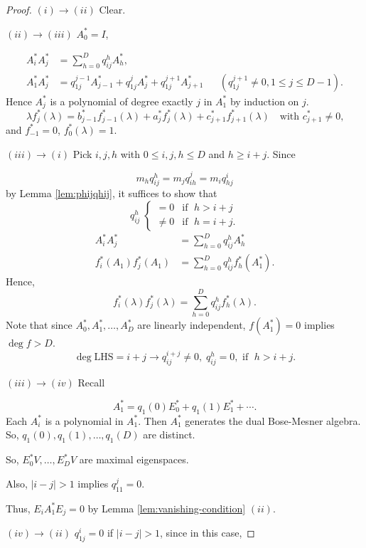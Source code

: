 \documentclass[
]{book}
\theoremstyle{definition}
\theoremstyle{definition}
\theoremstyle{definition}
\theoremstyle{definition}
\theoremstyle{remark}
\begin{document}
\begin{proof}
\leavevmode

\((i)\to (ii)\) Clear.

\((ii)\to(iii)\) \(A^*_0 = I\),

\begin{align}
A^*_iA^*_j & = \sum_{h=0}^D q^h_{ij} A^*_h,\\
A^*_1A^*_j & = q^{j-1}_{1j}A^*_{j-1} + q^j_{1j}A^*_j + q^{j+1}_{1j}A^*_{j+1} && (q^{j+1}_{1j}\neq 0, 1\leq j\leq D-1).
\end{align}
Hence \(A^*_j\) is a polynomial of degree exactly \(j\) in \(A^*_1\) by induction on \(j\).
\[\lambda f^*_j(\lambda) = b^*_{j-1}f^*_{j-1}(\lambda) + a^*_jf^*_j(\lambda) + c^*_{j+1}f^*_{j+1}(\lambda) \quad \text{with $c^*_{j+1}\neq 0$,}\]
and \(f^*_{-1} = 0\), \(f^*_0(\lambda) = 1\).

\((iii)\to(i)\) Pick \(i, j, h\) with \(0\leq i,j,h\leq D\) and \(h\geq i+j\). Since

\[m_hq^h_{ij} = m_jq^j_{ih} = m_iq^i_{hj}\]
by Lemma \ref{lem:phijqhij}, it suffices to show that
\[q^h_{ij} \; \begin{cases} = 0 & \text{if }\; h> i+j\\
\neq 0 & \text{if }\; h = i+j.
\end{cases}\]
\begin{align}
A^*_iA^*_j & = \sum_{h=0}^D q^h_{ij}A^*_h\\
f^*_i(A_1)f^*_j(A_1) & = \sum_{h=0}^D q^h_{ij}f^*_h(A_1^*).
\end{align}
Hence,
\[f^*_i(\lambda)f^*_j(\lambda) = \sum_{h=0}^Dq^h_{ij}f^*_h(\lambda).\]
Note that since \(A^*_0, A^*_1, \ldots, A^*_D\) are linearly independent, \(f(A^*_1) = 0\) implies \(\deg f > D\).
\[\deg \mathrm{LHS} = i+j \to q^{i+j}_{ij}\neq 0, \; q^h_{ij} = 0, \text{ if } \; h> i+j.\]

\((iii)\to (iv)\) Recall

\[A^*_1 = q_1(0)E^*_0 + q_1(1)E_1^* + \cdots .\]
Each \(A^*_i\) is a polynomial in \(A^*_1\). Then \(A^*_1\) generates the dual Bose-Mesner algebra. So,
\(q_1(0), q_1(1), \ldots, q_1(D)\) are distinct.

So, \(E^*_0V, \ldots, E^*_DV\) are maximal eigenspaces.

Also, \(|i-j|>1\) implies \(q^j_{11} = 0\).

Thus, \(E_iA^*_1E_j = 0\) by Lemma \ref{lem:vanishing-condition} \((ii)\).

\((iv)\to (ii)\) \(q^i_{1j} = 0\) if \(|i-j| > 1\), since in this case,


\end{proof}
\end{document}
